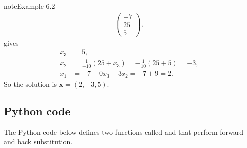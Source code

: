 \documentclass[letterpaper,10pt,english]{jupyterBook}
\begin{document}
\begin{sphinxadmonition}{note}{Example 6.2}
\begin{align*}
    \begin{pmatrix} -7 \\ 25 \\ 5 \end{pmatrix},
\end{align*}
\sphinxAtStartPar
gives
\begin{align*}
    x_3 &= 5,\\
    x_2 &= \frac{1}{-10}(25 + x_3) = -\frac{1}{10}(25 + 5) = -3,\\
    x_1 &= -7 - 0x_3 - 3x_2 = -7 + 9 = 2.
\end{align*}
\sphinxAtStartPar
So the solution is \(\mathbf{x}=(2,-3,5)\).
\end{sphinxadmonition}


\subsection{Python code}
\label{\detokenize{6_Direct_methods/6.1_LU_decomposition:id2}}
\sphinxAtStartPar
The Python code below defines two functions called  and  that perform forward and back substitution.
\end{document}
